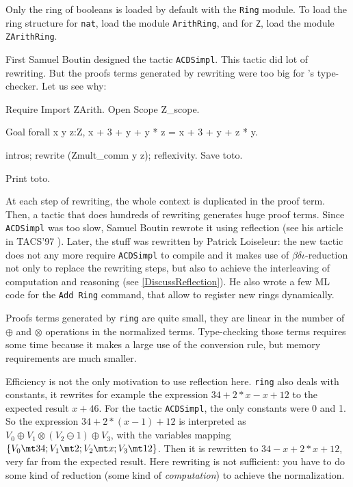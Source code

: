 \Warning Only the ring of booleans is loaded by default with the
\texttt{Ring} module. To load the ring structure for \texttt{nat},
load the module \texttt{ArithRing}, and for \texttt{Z},
load the module \texttt{ZArithRing}.


First Samuel Boutin designed the tactic \texttt{ACDSimpl}. 
This tactic did lot of rewriting. But the proofs
terms generated by rewriting were too big for \Coq's type-checker.
Let us see why:

\begin{coq_eval}
Require Import ZArith.
Open Scope Z_scope.
\end{coq_eval}
\begin{coq_example}
Goal forall x y z:Z, x + 3 + y + y * z = x + 3 + y + z * y.
\end{coq_example}
\begin{coq_example*}
intros; rewrite (Zmult_comm y z); reflexivity.
Save toto.
\end{coq_example*}
\begin{coq_example}
Print  toto.
\end{coq_example}

At each step of rewriting, the whole context is duplicated in the proof
term. Then, a tactic that does hundreds of rewriting generates huge proof
terms. Since \texttt{ACDSimpl} was too slow, Samuel Boutin rewrote it
using reflection (see his article in TACS'97 \cite{Bou97}). Later, the
stuff was rewritten by Patrick
Loiseleur: the new tactic does not any more require \texttt{ACDSimpl}
to compile and it makes use of $\beta\delta\iota$-reduction 
not only to replace the rewriting steps, but also to achieve the
interleaving of computation and 
reasoning (see \ref{DiscussReflection}). He also wrote a
few ML code for the \texttt{Add Ring} command, that allow to register
new rings dynamically.

Proofs terms generated by \texttt{ring} are quite small, they are
linear in the number of $\oplus$ and $\otimes$ operations in the
normalized terms. Type-checking those terms requires some time because it
makes a large use of the conversion rule, but
memory requirements are much smaller. 

\label{DiscussReflection}

Efficiency is not the only motivation to use reflection
here. \texttt{ring} also deals with constants, it rewrites for example the
expression $34 + 2*x -x + 12$ to the expected result $x + 46$. For the
tactic \texttt{ACDSimpl}, the only constants were 0 and 1. So the
expression $34 + 2*(x - 1) + 12$ is interpreted as 
$V_0 \oplus V_1 \otimes (V_2 \ominus 1) \oplus V_3$, 
with the variables mapping 
$\{V_0 \mt 34; V_1 \mt 2; V_2 \mt x; V_3 \mt 12 \}$. Then it is
rewritten to $34 - x + 2*x + 12$, very far from the expected
result. Here rewriting is not sufficient: you have to do some kind of
reduction (some kind of \textit{computation}) to achieve the
normalization.

